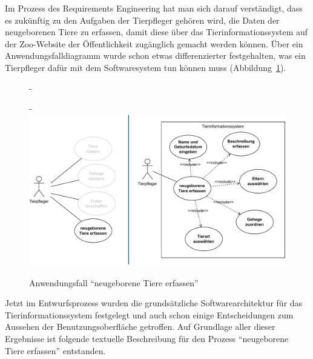 Im Prozess des Requirements Engineering hat man sich darauf verständigt, dass es zukünftig zu den Aufgaben der Tierpfleger gehören wird, die Daten der neugeborenen Tiere zu erfassen, damit diese über das Tierinformationssystem auf der Zoo-Website der Öffentlichkeit zugänglich gemacht werden können. Über ein Anwendungsfall\-diagramm wurde schon etwas differenzierter festgehalten, was ein Tierpfleger dafür mit dem Softwaresystem tun können muss (Abbildung~\ref{fig:neugeborene_tiere_erfassen}).

\begin{figure}[h!]
	\begin{addmargin*}[0cm]{-\marginparwidth}
	\begin{addmargin*}[0cm]{-\marginparsep}
		\vspace{\baselineskip} %
		\centering
		\includegraphics[scale=0.9]{Bilder/Kapitel-8/neugeborene_tiere_erfassen.pdf}
		\caption{Anwendungsfall "`neugeborene Tiere erfassen"'}
		\label{fig:neugeborene_tiere_erfassen}
	\end{addmargin*}
	\end{addmargin*}	
\end{figure}

Jetzt im Entwurfsprozess wurden die grundsätzliche Softwarearchitektur für das Tier\-informations\-system festgelegt und auch schon einige Entscheidungen zum Aussehen der Benutzungsoberfläche getroffen. Auf Grundlage aller dieser Ergebnisse ist folgende textuelle Beschreibung für den Prozess "`neugeborene Tiere erfassen"' entstanden.

